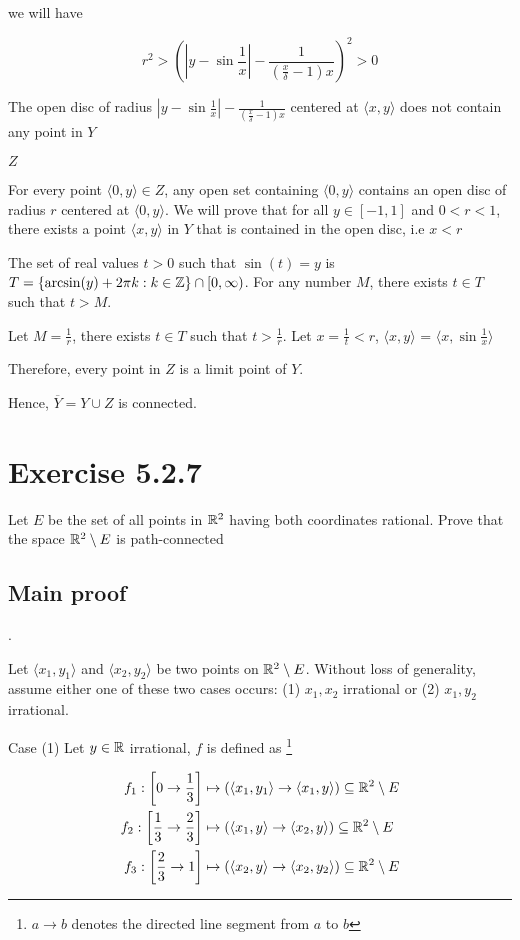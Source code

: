 \documentclass{article}
\begin{document}
we will have

$$
    r^2 > \left(\left| y - \sin \frac{1}{x} \right| - \frac{1}{(\frac{x}{\delta} - 1) x}\right)^2 > 0
$$

The open disc of radius $\left| y - \sin \frac{1}{x} \right| - \frac{1}{(\frac{x}{\delta} - 1) x}$ centered at $\langle x, y \rangle$ does not contain any point in $Y$

$Z$

For every point $\langle 0, y \rangle \in Z$, any open set containing $\langle 0, y \rangle$ contains an open disc of radius $r$ centered at $\langle 0, y \rangle$. We will prove that for all $y \in [-1, 1]$ and $0 < r < 1$, there exists a point $\langle x, y \rangle$ in $Y$ that is contained in the open disc, i.e $x < r$

The set of real values $t > 0$ such that $\sin(t) = y$ is $T= \{ \arcsin(y) + 2\pi k: k \in \mathbb{Z} \} \cap [0, \infty)$. For any number $M$, there exists $t \in T$ such that $t > M$.

Let $M = \frac{1}{r}$, there exists $t \in T$ such that $t > \frac{1}{r}$. Let $x = \frac{1}{t} < r$, $\langle x, y \rangle$ = $\langle x, \sin \frac{1}{x} \rangle$

Therefore, every point in $Z$ is a limit point of $Y$.

Hence, $\overline{Y} = Y \cup Z$ is connected.

\section*{Exercise 5.2.7}

Let $E$ be the set of all points in $\mathbb{R}^2$ having both coordinates rational. Prove that the space $\mathbb{R}^2 \setminus E$ is path-connected

\subsection*{Main proof} .

Let $\langle x_1, y_1\rangle$ and $\langle x_2, y_2\rangle$ be two points on $\mathbb{R}^2 \setminus E$. Without loss of generality, assume either one of these two cases occurs: (1) $x_1, x_2$ irrational or (2) $x_1, y_2$ irrational.

Case (1)
Let $y \in \mathbb{R}$ irrational, $f$ is defined as \footnote{$a \to b$ denotes the directed line segment from $a$ to $b$}

\begin{align*}
    f_1: \left[ 0 \to \frac{1}{3} \right] &\mapsto (\langle x_1, y_1\rangle \to \langle x_1, y\rangle) \subseteq \mathbb{R}^2 \setminus E \\
    f_2: \left[\frac{1}{3} \to \frac{2}{3}\right] &\mapsto (\langle x_1, y\rangle \to \langle x_2, y\rangle) \subseteq \mathbb{R}^2 \setminus E \\
    f_3: \left[\frac{2}{3} \to 1 \right] &\mapsto (\langle x_2, y\rangle \to \langle x_2, y_2\rangle) \subseteq \mathbb{R}^2 \setminus E \\
\end{align*}
\end{document}
